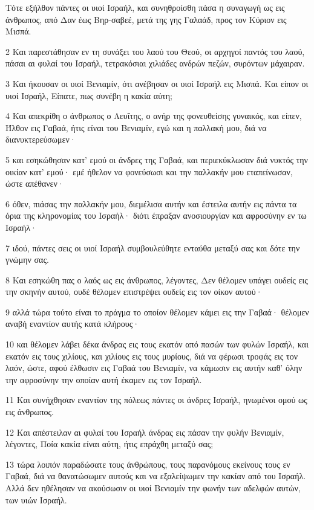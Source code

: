\par Τότε εξήλθον πάντες οι υιοί Ισραήλ, και συνηθροίσθη πάσα η συναγωγή ως εις άνθρωπος, από Δαν έως Βηρ-σαβεέ, μετά της γης Γαλαάδ, προς τον Κύριον εις Μισπά.
\par 2 Και παρεστάθησαν εν τη συνάξει του λαού του Θεού, οι αρχηγοί παντός του λαού, πάσαι αι φυλαί του Ισραήλ, τετρακόσιαι χιλιάδες ανδρών πεζών, συρόντων μάχαιραν.
\par 3 Και ήκουσαν οι υιοί Βενιαμίν, ότι ανέβησαν οι υιοί Ισραήλ εις Μισπά. Και είπον οι υιοί Ισραήλ, Είπατε, πως συνέβη η κακία αύτη;
\par 4 Και απεκρίθη ο άνθρωπος ο Λευΐτης, ο ανήρ της φονευθείσης γυναικός, και είπεν, Ήλθον εις Γαβαά, ήτις είναι του Βενιαμίν, εγώ και η παλλακή μου, διά να διανυκτερεύσωμεν·
\par 5 και εσηκώθησαν κατ' εμού οι άνδρες της Γαβαά, και περιεκύκλωσαν διά νυκτός την οικίαν κατ' εμού· εμέ ήθελον να φονεύσωσι και την παλλακήν μου εταπείνωσαν, ώστε απέθανεν·
\par 6 όθεν, πιάσας την παλλακήν μου, διεμέλισα αυτήν και έστειλα αυτήν εις πάντα τα όρια της κληρονομίας του Ισραήλ· διότι έπραξαν ανοσιουργίαν και αφροσύνην εν τω Ισραήλ·
\par 7 ιδού, πάντες σεις οι υιοί Ισραήλ συμβουλεύθητε ενταύθα μεταξύ σας και δότε την γνώμην σας.
\par 8 Και εσηκώθη πας ο λαός ως εις άνθρωπος, λέγοντες, Δεν θέλομεν υπάγει ουδείς εις την σκηνήν αυτού, ουδέ θέλομεν επιστρέψει ουδείς εις τον οίκον αυτού·
\par 9 αλλά τώρα τούτο είναι το πράγμα το οποίον θέλομεν κάμει εις την Γαβαά· θέλομεν αναβή εναντίον αυτής κατά κλήρους·
\par 10 και θέλομεν λάβει δέκα άνδρας εις τους εκατόν από πασών των φυλών Ισραήλ, και εκατόν εις τους χιλίους, και χιλίους εις τους μυρίους, διά να φέρωσι τροφάς εις τον λαόν, ώστε, αφού έλθωσιν εις Γαβαά του Βενιαμίν, να κάμωσιν εις αυτήν καθ' όλην την αφροσύνην την οποίαν αυτή έκαμεν εις τον Ισραήλ.
\par 11 Και συνήχθησαν εναντίον της πόλεως πάντες οι άνδρες Ισραήλ, ηνωμένοι ομού ως εις άνθρωπος.
\par 12 Και απέστειλαν αι φυλαί του Ισραήλ άνδρας εις πάσαν την φυλήν Βενιαμίν, λέγοντες, Ποία κακία είναι αύτη, ήτις επράχθη μεταξύ σας;
\par 13 τώρα λοιπόν παραδώσατε τους άνθρώπους, τους παρανόμους εκείνους τους εν Γαβαά, διά να θανατώσωμεν αυτούς και να εξαλείψωμεν την κακίαν από του Ισραήλ. Αλλά δεν ηθέλησαν να ακούσωσιν οι υιοί Βενιαμίν την φωνήν των αδελφών αυτών, των υιών Ισραήλ.
